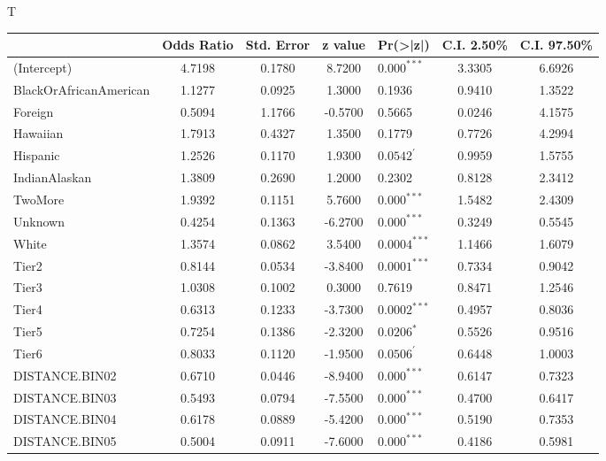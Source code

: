 \documentclass[12pt,english]{report}
\begin{document}
T





\begin{table}[]
\centering
\begin{adjustbox}{width=1.05\textwidth}

\begin{tabular}{lccclcc}
\\[-1.8ex]\hline
\hline
                                & Odds Ratio & Std. Error & z value
& Pr(\textgreater|z|) & C.I. 2.50\% & C.I. 97.50\% \\ \hline
(Intercept)             & 4.7198 & 0.1780 & 8.7200   & $0.000^{***}$ & 3.3305 &
6.6926\\
BlackOrAfricanAmerican  & 1.1277 & 0.0925 & 1.3000   & 0.1936 & 0.9410 & 1.3522\\
Foreign  & 0.5094 & 1.1766 & -0.5700  & 0.5665 & 0.0246 & 4.1575\\
Hawaiian  & 1.7913 & 0.4327 & 1.3500   & 0.1779 & 0.7726 & 4.2994\\
Hispanic  & 1.2526 & 0.1170 & 1.9300   & $0.0542^{'}$ & 0.9959 & 1.5755\\
IndianAlaskan           & 1.3809 & 0.2690 & 1.2000   & 0.2302 & 0.8128 & 2.3412\\
TwoMore   & 1.9392 & 0.1151 & 5.7600   & $0.000^{***}$ & 1.5482 & 2.4309\\
Unknown   & 0.4254 & 0.1363 & -6.2700  & $0.000^{***}$ & 0.3249 & 0.5545\\
White     & 1.3574 & 0.0862 & 3.5400   & $0.0004^{***}$ & 1.1466 & 1.6079\\
Tier2     & 0.8144 & 0.0534 & -3.8400  & $0.0001^{***}$ & 0.7334 & 0.9042\\
Tier3     & 1.0308 & 0.1002 & 0.3000   & 0.7619 & 0.8471 & 1.2546\\
Tier4     & 0.6313 & 0.1233 & -3.7300  & $0.0002^{***}$ & 0.4957 & 0.8036\\
Tier5   & 0.7254 & 0.1386 & -2.3200  & $0.0206^{*}$ & 0.5526 & 0.9516\\
Tier6 & 0.8033 & 0.1120 & -1.9500  & $0.0506^{'}$ & 0.6448 & 1.0003\\
DISTANCE.BIN02  & 0.6710 & 0.0446 & -8.9400  & $0.000^{***}$ & 0.6147 &0.7323\\
DISTANCE.BIN03 & 0.5493 & 0.0794 & -7.5500  & $0.000^{***}$ & 0.4700 & 0.6417\\
DISTANCE.BIN04 & 0.6178 & 0.0889 & -5.4200  &$0.000^{***}$ & 0.5190 & 0.7353\\
DISTANCE.BIN05 & 0.5004 & 0.0911 & -7.6000  & $0.000^{***}$ & 0.4186 & 0.5981\\

\end{tabular}
\end{adjustbox}
\end{table}
\end{document}
